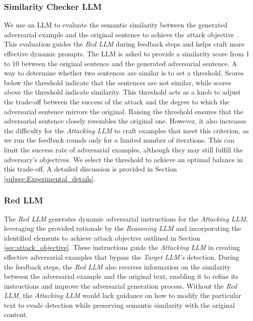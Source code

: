 \documentclass[11pt]{article}
\begin{document}
\subsubsection{Similarity Checker LLM}
We use an LLM to evaluate the semantic similarity between the generated adversarial example and the original sentence to achieve the attack objective . This evaluation guides the \textsl{Red LLM} during feedback steps and helps craft more effective dynamic prompts. The LLM is asked to provide a similarity score from 1 to 10 between the original sentence and the generated adversarial sentence. A way to determine whether two sentences are similar is to set a threshold. Scores below the threshold indicate that the sentences are not similar, while scores above the threshold indicate similarity. This threshold acts as a knob to adjust the trade-off between the success of the attack and the degree to which the adversarial sentence mirrors the original. Raising the threshold ensures that the adversarial sentence closely resembles the original one. However, it also increases the difficulty for the \textsl{Attacking LLM} to craft examples that meet this criterion, as we run the feedback rounds only for a limited number of iterations. This can limit the success rate of adversarial examples, although they may still fulfill the adversary’s objectives. We select the threshold to achieve an optimal balance in this trade-off. A detailed discussion is provided in Section \ref{subsec:Experimental_details}.

\subsubsection{Red LLM}
The \textsl{Red LLM} generates dynamic adversarial instructions for the \textsl{Attacking LLM}, leveraging the provided rationale by the \textsl{Reasoning LLM} and incorporating the identified elements to achieve attack objective  outlined in Section \ref{sec:attack_objective}. These instructions guide the \textsl{Attacking LLM} in creating effective adversarial examples that bypass the \textsl{Target LLM's} detection. During the feedback steps, the \textsl{Red LLM} also receives information on the similarity between the adversarial example and the original text, enabling it to refine its instructions and improve the adversarial generation process. Without the \textsl{Red LLM}, the \textsl{Attacking LLM} would lack guidance on how to modify the particular text to evade detection while preserving semantic similarity with the original content.
\end{document}
